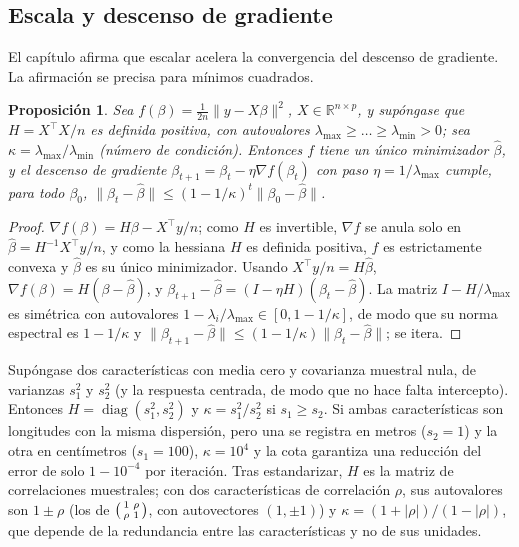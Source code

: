 \documentclass[11pt,a4paper]{article}
\theoremstyle{plain}
\newtheorem{proposicion}[teorema]{Proposición}
\theoremstyle{definition}
\theoremstyle{remark}
\newcommand{\R}{\mathbb{R}}
\newcommand{\1}{\mathbf{1}}
\begin{document}
\subsection{Escala y descenso de gradiente}

El capítulo afirma que escalar acelera la convergencia del descenso de
gradiente. La afirmación se precisa para mínimos cuadrados.

\begin{proposicion}\label{prop:cond}
Sea $f(\beta)=\frac1{2n}\|y-X\beta\|^2$, $X\in\R^{n\times p}$, y
supóngase que $H=X^\top X/n$ es definida positiva, con autovalores
$\lambda_{\max}\ge\dots\ge\lambda_{\min}>0$; sea
$\kappa=\lambda_{\max}/\lambda_{\min}$ (\emph{número de condición}). Entonces
$f$ tiene un único minimizador $\hat\beta$, y el descenso de gradiente
$\beta_{t+1}=\beta_t-\eta\nabla f(\beta_t)$ con paso $\eta=1/\lambda_{\max}$
cumple, para todo $\beta_0$,
$\|\beta_t-\hat\beta\|\le(1-1/\kappa)^t\|\beta_0-\hat\beta\|$.
\end{proposicion}

\begin{proof}
$\nabla f(\beta)=H\beta-X^\top y/n$; como $H$ es invertible, $\nabla f$ se
anula solo en $\hat\beta=H^{-1}X^\top y/n$, y como la hessiana $H$ es
definida positiva, $f$ es estrictamente convexa y $\hat\beta$ es su único
minimizador. Usando $X^\top y/n=H\hat\beta$, $\nabla
f(\beta)=H(\beta-\hat\beta)$, y
$\beta_{t+1}-\hat\beta=(I-\eta H)(\beta_t-\hat\beta)$. La matriz
$I-H/\lambda_{\max}$ es simétrica con autovalores
$1-\lambda_i/\lambda_{\max}\in[0,1-1/\kappa]$, de modo que su norma
espectral es $1-1/\kappa$ y
$\|\beta_{t+1}-\hat\beta\|\le(1-1/\kappa)\|\beta_t-\hat\beta\|$; se itera.
\end{proof}

Supóngase dos características con media cero y covarianza muestral nula,
de varianzas $s_1^2$ y $s_2^2$ (y la respuesta centrada, de modo que no
hace falta intercepto). Entonces $H=\operatorname{diag}(s_1^2,s_2^2)$ y
$\kappa=s_1^2/s_2^2$ si $s_1\ge s_2$. Si ambas características son
longitudes con la misma dispersión, pero una se registra en metros
($s_2=1$) y la otra en centímetros ($s_1=100$), $\kappa=10^4$ y la
cota garantiza una reducción del error de solo $1-10^{-4}$ por iteración.
Tras estandarizar, $H$ es la matriz de correlaciones muestrales; con dos
características de correlación $\rho$, sus autovalores son $1\pm\rho$ (los
de $\begin{psmallmatrix}1&\rho\\\rho&1\end{psmallmatrix}$, con
autovectores $(1,\pm1)$) y $\kappa=(1+|\rho|)/(1-|\rho|)$, que depende de
la redundancia entre las características y no de sus unidades.
\end{document}
